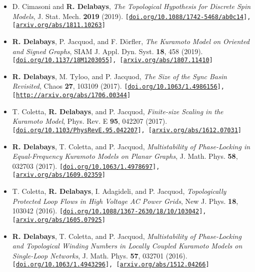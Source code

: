 \documentclass[10pt]{article}
\begin{document}
\begin{itemize}
 \item D. Cimasoni and \textcolor{hei}{\bf R. Delabays}, 
 \textit{The Topological Hypothesis for Discrete Spin Models},
 J. Stat. Mech. \textbf{2019} (2019).
 {\footnotesize \tt [\url{doi.org/10.1088/1742-5468/ab0c14}], [\url{arxiv.org/abs/1811.10263}]}
 
 \item \textcolor{hei}{\bf R. Delabays}, P. Jacquod, and F. D\"orfler, 
 \textit{The Kuramoto Model on Oriented and Signed Graphs}, 
 SIAM J. Appl. Dyn. Syst. \textbf{18}, 458 (2019).
 {\footnotesize \tt [\url{doi.org/10.1137/18M1203055}], [\url{arxiv.org/abs/1807.11410}]}

 \item \textcolor{hei}{\bf R. Delabays}, M. Tyloo, and P. Jacquod, 
 \textit{The Size of the Sync Basin Revisited}, 
 Chaos \textbf{27}, 103109 (2017).
 {\footnotesize \tt [\url{doi.org/10.1063/1.4986156}], [\url{http://arxiv.org/abs/1706.00344}]}
 
 \item T. Coletta, \textcolor{hei}{\bf R. Delabays}, and P. Jacquod, 
 \textit{Finite-size Scaling in the Kuramoto Model}, 
 Phys. Rev. E \textbf{95}, 042207 (2017).
 {\footnotesize \tt [\url{doi.org/10.1103/PhysRevE.95.042207}], [\url{arxiv.org/abs/1612.07031}]}
 
 \item \textcolor{hei}{\bf R. Delabays}, T. Coletta, and P. Jacquod, 
 \textit{Multistability of Phase-Locking in Equal-Frequency Kuramoto Models on Planar Graphs}, 
 J. Math. Phys. \textbf{58}, 032703 (2017).
 {\footnotesize \tt [\url{doi.org/10.1063/1.4978697}], [\url{arxiv.org/abs/1609.02359}]}

 \item T. Coletta, \textcolor{hei}{\bf R. Delabays}, I. Adagideli, and P. Jacquod, 
 \textit{Topologically Protected Loop Flows in High Voltage AC Power Grids}, 
 New J. Phys. \textbf{18}, 103042 (2016).
 {\footnotesize \tt [\url{doi.org/10.1088/1367-2630/18/10/103042}], [\url{arxiv.org/abs/1605.07925}]}
 
 \item \textcolor{hei}{\bf R. Delabays}, T. Coletta, and P. Jacquod, 
 \textit{Multistability of Phase-Locking and Topological Winding Numbers in Locally Coupled Kuramoto Models on Single-Loop Networks}, 
 J. Math. Phys. \textbf{57}, 032701 (2016).
 {\footnotesize \tt [\url{doi.org/10.1063/1.4943296}], [\url{arxiv.org/abs/1512.04266}]}
\end{itemize}
\end{document}
